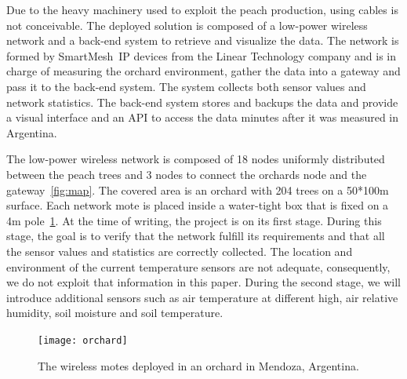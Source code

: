 \documentclass{sig-alternate}
\newcommand{\smip}                  {SmartMesh~IP\xspace}
\begin{document}

Due to the heavy machinery used to exploit the peach production, using cables is not conceivable.
The deployed solution is composed of a low-power wireless network and a back-end system to retrieve and visualize the data.
The network is formed by \smip devices from the Linear Technology company and is in charge of measuring the orchard environment, gather the data into a gateway and pass it to the back-end system.
The system collects both sensor values and network statistics.
The back-end system stores and backups the data and provide a visual interface and an API to access the data minutes after it was measured in Argentina.


The low-power wireless network is composed of 18 nodes uniformly distributed between the peach trees and 3 nodes to connect the orchards node and the gateway~\ref{fig:map}.
The covered area is an orchard with 204 trees on a 50*100m surface.
Each network mote is placed inside a water-tight box that is fixed on a 4m pole~\ref{fig:orchard}.
At the time of writing, the project is on its first stage.
During this stage, the goal is to verify that the network fulfill its requirements and that all the sensor values and statistics are correctly collected.
The location and environment of the current temperature sensors are not adequate, consequently, we do not exploit that information in this paper.
During the second stage, we will introduce additional sensors such as air temperature at different high, air relative humidity, soil moisture and soil temperature.

\begin{figure}
    \centering
    \texttt{[image: orchard]}
    \caption{The wireless motes deployed in an orchard in Mendoza, Argentina.}
    \label{fig:orchard}
\end{figure}
\end{document}
